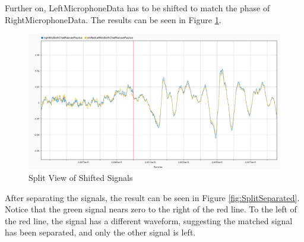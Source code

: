 Further on, LeftMicrophoneData has to be shifted to match the phase of RightMicrophoneData.
The results can be seen in Figure \ref{fig:SplitShifted}.
\begin{figure}[htp]
	\centering
	\includegraphics[width=.9\textwidth]{Illustrations/shiftedLeftAndRightSplitView.png}
	\caption{Split View of Shifted Signals}
	\label{fig:SplitShifted}
\end{figure}

After separating the signals, the result can be seen in Figure \ref{fig:SplitSeparated}.
Notice that the green signal nears zero to the right of the red line. To the left of the
red line, the signal has a different waveform, suggesting the matched signal has been
separated, and only the other signal is left.

